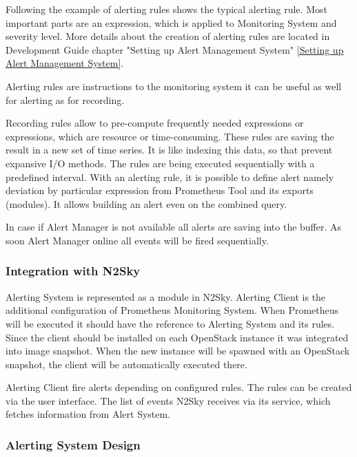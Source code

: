 Following the example of alerting rules shows the typical alerting rule. Most important parts are an expression, which is applied to Monitoring System and severity level.  More details about the creation of alerting rules are located in Development Guide chapter "Setting up Alert Management System" \autoref{Setting up Alert Management System}.

Alerting rules are instructions to the monitoring system it can be useful as well for alerting as for recording. 

Recording rules allow to pre-compute frequently needed expressions or expressions, which are resource or time-consuming.  These rules are saving the result in a new set of time series. It is like indexing this data, so that prevent expansive I/O methods. 
The rules are being executed sequentially with a predefined interval. 
With an alerting rule, it is possible to define alert namely deviation by particular expression from Prometheus Tool and its exports (modules). It allows building an alert even on the combined query. 

In case if Alert Manager is not available all alerts are saving into the buffer. As soon Alert Manager online all events will be fired sequentially. 



\subsubsection{Integration with N2Sky}\label{Integration with N2Sky Alerting}

Alerting System is represented as a module in N2Sky. 
Alerting Client is the additional configuration of Prometheus Monitoring System. When Prometheus will be executed it should have the reference to Alerting System and its rules. 
Since the client should be installed on each OpenStack instance it was integrated into image snapshot. When the new instance will be spawned with an OpenStack snapshot, the client will be automatically executed there.  

Alerting Client fire alerts depending on configured rules. The rules can be created via the user interface. The list of events N2Sky receives via its service, which fetches information from Alert System. 
 
\subsubsection{Alerting System Design}\label{Alerting System Design}


